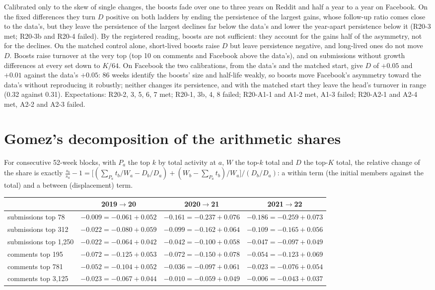 \documentclass[10pt]{article}
\begin{document}
Calibrated only to the skew of single changes, the boosts fade over one to three years on Reddit and half a year to a year on Facebook. On the fixed differences they turn $D$ positive on both ladders by ending the persistence of the largest gains, whose follow-up ratio comes close to the data's, but they leave the persistence of the largest declines far below the data's and lower the year-apart persistence below it (R20-3 met; R20-3b and R20-4 failed). By the registered reading, boosts are not sufficient: they account for the gains half of the asymmetry, not for the declines. On the matched control alone, short-lived boosts raise $D$ but leave persistence negative, and long-lived ones do not move $D$. Boosts raise turnover at the very top (top 10 on comments and Facebook above the data's), and on submissions without growth differences at every set down to $K/64$. On Facebook the two calibrations, from the data's and the matched start, give $D$ of $+0.05$ and $+0.01$ against the data's $+0.05$: 86 weeks identify the boosts' size and half-life weakly, so boosts move Facebook's asymmetry toward the data's without reproducing it robustly; neither changes its persistence, and with the matched start they leave the head's turnover in range (0.32 against 0.31). Expectations: R20-2, 3, 5, 6, 7 met; R20-1, 3b, 4, 8 failed; R20-A1-1 and A1-2 met, A1-3 failed; R20-A2-1 and A2-4 met, A2-2 and A2-3 failed.

\section{Gomez's decomposition of the arithmetic shares}
For consecutive 52-week blocks, with $P_a$ the top $k$ by total activity at $a$, $W$ the top-$k$ total and $D$ the top-$K$ total, the relative change of the share is exactly
$\frac{s_b}{s_a}-1 = \big[(\sum_{P_a} t_b/W_a - D_b/D_a) + (W_b - \sum_{P_a} t_b)/W_a\big]/(D_b/D_a)$: a within term (the initial members against the total) and a between (displacement) term.
\begin{center}\small\begin{tabular}{lccc}
\toprule
 & 2019$\to$20 & 2020$\to$21 & 2021$\to$22\\
\midrule
submissions top 78 & $-0.009 = -0.061 + 0.052$ & $-0.161 = -0.237 + 0.076$ & $-0.186 = -0.259 + 0.073$\\
submissions top 312 & $-0.022 = -0.080 + 0.059$ & $-0.099 = -0.162 + 0.064$ & $-0.109 = -0.165 + 0.056$\\
submissions top 1,250 & $-0.022 = -0.064 + 0.042$ & $-0.042 = -0.100 + 0.058$ & $-0.047 = -0.097 + 0.049$\\
comments top 195 & $-0.072 = -0.125 + 0.053$ & $-0.072 = -0.150 + 0.078$ & $-0.054 = -0.123 + 0.069$\\
comments top 781 & $-0.052 = -0.104 + 0.052$ & $-0.036 = -0.097 + 0.061$ & $-0.023 = -0.076 + 0.054$\\
comments top 3,125 & $-0.023 = -0.067 + 0.044$ & $-0.010 = -0.059 + 0.049$ & $-0.006 = -0.043 + 0.037$\\
\bottomrule
\end{tabular}\end{center}
\end{document}
